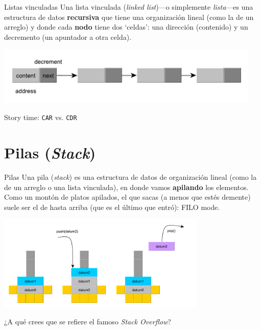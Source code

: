\documentclass[spanish, c]{beamer}
\begin{document}
\begin{frame}{Listas vinculadas}
    Una \alert{lista vinculada} (\textit{linked list})---o simplemente \textit{lista}---es una estructura de datos \textbf{recursiva} que tiene una organización lineal (como la de un arreglo) y donde cada \textbf{nodo} tiene dos `celdas': una dirección (contenido) y un decremento (un apuntador a otra celda).

    \bigskip

    \begin{center}
        \includegraphics[width=0.95\textwidth]{list.pdf}
    \end{center} \pause

    \bigskip

    \begin{center}
        Story time: \texttt{CAR} vs. \texttt{CDR}
    \end{center}
\end{frame}

\section{Pilas (\textit{Stack})}

\begin{frame}{Pilas}
    Una \alert{pila} (\textit{stack}) es una estructura de datos de organización lineal (como la de un arreglo o una lista vinculada), en donde vamos \textbf{apilando} los elementos. Como un montón de platos apilados, el que sacas (a menos que estés demente) suele ser el de hasta arriba (que es el último que entró): FILO mode.

    \begin{center}
        \includegraphics[width=0.75\textwidth]{stack.pdf}
    \end{center} \pause

    \begin{center}
        ¿A qué crees que se refiere el famoso \textit{Stack Overflow}?
    \end{center}

\end{frame}
\end{document}
